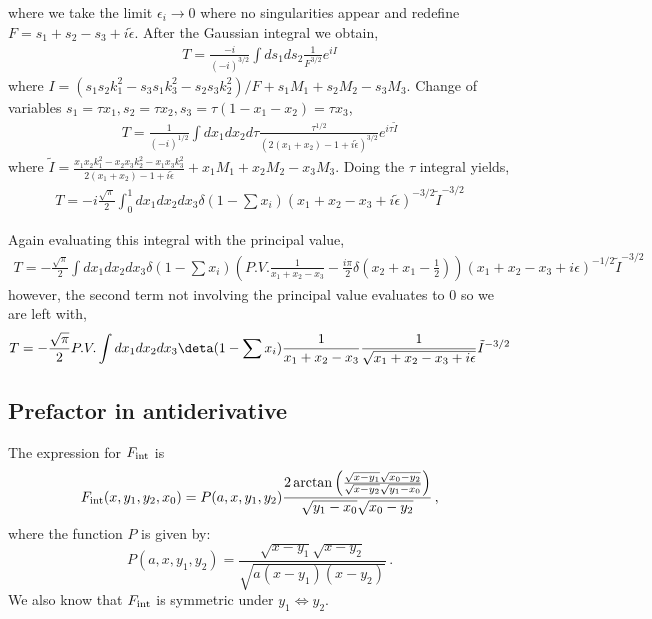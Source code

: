 \documentclass[twoside]{article}
\begin{document}
where we take the limit $\epsilon_i \rightarrow 0$ where no singularities appear and redefine $F = s_1 + s_2 - s_3 + i\tilde{\epsilon}$.
After the Gaussian integral we obtain,
\begin{align}
  T = \frac{-i}{(-i)^{3/2}}\int ds_1ds_2 \frac{1}{F^{3/2}}e^{iI}
\end{align}
where $I = (s_1s_2k^2_1 - s_3s_1k^2_3 - s_2s_3k^2_2)/F + s_1M_1 + s_2M_2 - s_3M_3$. Change of variables $s_1 = \tau x_1, s_2 = \tau x_2, s_3
= \tau (1 - x_1 - x_2) = \tau x_3$,
\begin{align}
  T = \frac{1}{(-i)^{1/2}}\int dx_1dx_2d\tau \frac{\tau^{1/2}}{\left(2(x_1 + x_2) - 1 + i\tilde{\epsilon}\right)^{3/2}}e^{i\tau
  \tilde{I}}
\end{align}
where $\tilde{I} = \frac{x_1x_2k^2_1 - x_2x_3k^2_2 - x_1x_3k^2_3}{2(x_1 + x_2) - 1 + i\tilde{\epsilon}} + x_1M_1 + x_2M_2 - x_3M_3$. Doing
the $\tau$ integral yields,
\begin{align}
  T = -i\frac{\sqrt{\pi}}{2}\int^1_0dx_1dx_2 dx_3\delta(1-\sum x_i)\left( x_1 + x_2 - x_3 + i\tilde{\epsilon} \right)^{-3/2}\tilde{I}^{-3/2}
\end{align}

Again evaluating this integral with the principal value,
\begin{align}
  T = -\frac{\sqrt{\pi}}{2}\int dx_1dx_2dx_3\delta(1-\sum x_i)\left( P.V. \frac{1}{x_1 + x_2 - x_3} - \frac{i\pi}{2}\delta(x_2 + x_1 -
  \frac{1}{2}) \right)(x_1 + x_2 - x_3 + i\epsilon)^{-1/2}\tilde{I}^{-3/2}
\end{align}
however, the second term not involving the principal value evaluates to 0 so we are left with,
\begin{equation}
  \label{eq:trimxy}
  T = -\frac{\sqrt{\pi}}{2}P.V.\int dx_1dx_2dx_3 \deta(1-\sum x_i)\frac{1}{x_1 + x_2 - x_3}\frac{1}{\sqrt{x_1 + x_2 - x_3 + i\epsilon}}
  \tilde{I}^{-3/2}
\end{equation}
\subsection{Prefactor in antiderivative}

The expression for $F_{\rm int}$ is
\begin{equation}
F_{\rm int}(x,y_1,y_2,x_0) = P(a,x,y_1,y_2)\frac{2 \arctan\left(\frac{\sqrt{x-y_1} \sqrt{x_0-y_2}}{\sqrt{x-y_2} \sqrt{y_1-x_0}}\right)}{\sqrt{y_1 - x_0}\sqrt{x_0 - y_2}}\,,
\end{equation}
where the function $P$ is given by:
\begin{equation}
P(a,x,y_1,y_2)=\frac{\sqrt{x-y_1} \sqrt{x-y_2}}{\sqrt{a (x-y_1) (x-y_2)}}\,.
\end{equation}
We also know that $F_{\rm int}$ is symmetric under $y_1 \Leftrightarrow y_2$.
\end{document}
